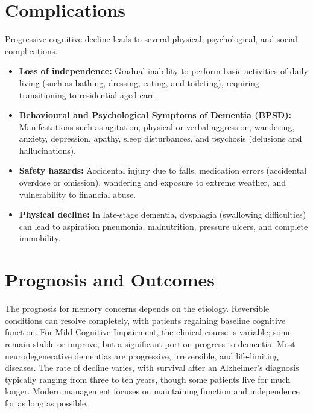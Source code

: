 \section*{Complications}
Progressive cognitive decline leads to several physical, psychological, and social complications.
\begin{itemize}
    \item \textbf{Loss of independence:} Gradual inability to perform basic activities of daily living (such as bathing, dressing, eating, and toileting), requiring transitioning to residential aged care.
    \item \textbf{Behavioural and Psychological Symptoms of Dementia (BPSD):} Manifestations such as agitation, physical or verbal aggression, wandering, anxiety, depression, apathy, sleep disturbances, and psychosis (delusions and hallucinations).
    \item \textbf{Safety hazards:} Accidental injury due to falls, medication errors (accidental overdose or omission), wandering and exposure to extreme weather, and vulnerability to financial abuse.
    \item \textbf{Physical decline:} In late-stage dementia, dysphagia (swallowing difficulties) can lead to aspiration pneumonia, malnutrition, pressure ulcers, and complete immobility.
\end{itemize}

\section*{Prognosis and Outcomes}
The prognosis for memory concerns depends on the etiology. Reversible conditions can resolve completely, with patients regaining baseline cognitive function. For Mild Cognitive Impairment, the clinical course is variable; some remain stable or improve, but a significant portion progress to dementia. Most neurodegenerative dementias are progressive, irreversible, and life-limiting diseases. The rate of decline varies, with survival after an Alzheimer's diagnosis typically ranging from three to ten years, though some patients live for much longer. Modern management focuses on maintaining function and independence for as long as possible.

